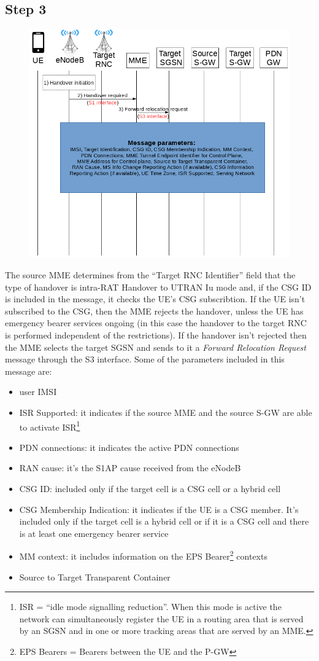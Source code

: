 \subsection*{Step 3}
\begin{figure}[htb]
	\centering
	\includegraphics[width=0.9\linewidth]{img/3.png}
	\label{fig:3}
\end{figure}
The source MME determines from the ``Target RNC Identifier'' field that
the type of handover is intra-RAT Handover to UTRAN Iu mode and, if the CSG ID
is included in the message, it checks the UE's CSG subscribtion. If the UE isn't
subscribed to the CSG, then the MME rejects the handover, unless the UE has
emergency bearer services ongoing (in this case the handover to the target RNC is
performed independent of the restrictions).	If the handover isn't rejected then
the MME selects the target SGSN and sends to it	a \emph{Forward Relocation Request}
message through the S3 interface. Some of the parameters included in this message are:
\begin{itemize}
	\item user IMSI
	\item ISR Supported: it indicates if the source MME and the source S-GW are
	able to activate ISR\footnote{ISR = ``idle mode signalling reduction''. When
	this mode is active the network can simultaneously register the UE in a
	routing area that is served by an SGSN and in one or more tracking areas
	that are served by an MME.}
	\item PDN connections: it indicates the active PDN connections
	\item RAN cause: it's the S1AP cause received from the eNodeB
	\item CSG ID: included only if the target cell is a CSG cell or a hybrid cell
	\item CSG Membership Indication: it indicates if the UE is a CSG member. It's
	included only if the target cell is a hybrid cell or if it is a CSG cell and
	there is at least one emergency bearer service
	\item MM context: it includes information on the EPS Bearer\footnote{EPS Bearers
	= Bearers between the UE and the P-GW} contexts
	\item Source to Target Transparent Container
\end{itemize}
